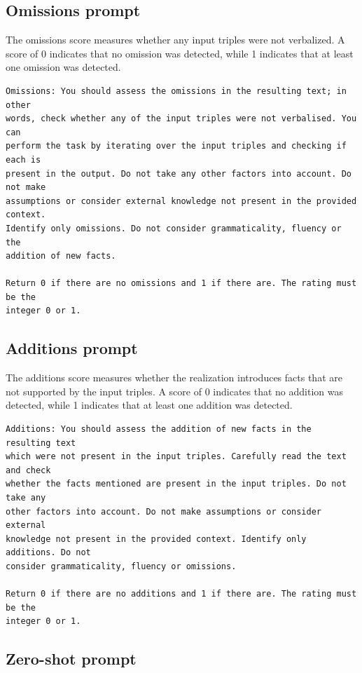 \subsection{Omissions prompt}

The omissions score measures whether any input triples were not verbalized. A
score of 0 indicates that no omission was detected, while 1 indicates that at
least one omission was detected.

\begin{lstlisting}
Omissions: You should assess the omissions in the resulting text; in other
words, check whether any of the input triples were not verbalised. You can
perform the task by iterating over the input triples and checking if each is
present in the output. Do not take any other factors into account. Do not make
assumptions or consider external knowledge not present in the provided context.
Identify only omissions. Do not consider grammaticality, fluency or the
addition of new facts.

Return 0 if there are no omissions and 1 if there are. The rating must be the
integer 0 or 1.
\end{lstlisting}

\subsection{Additions prompt}

The additions score measures whether the realization introduces facts that are
not supported by the input triples. A score of 0 indicates that no addition was
detected, while 1 indicates that at least one addition was detected.

\begin{lstlisting}
Additions: You should assess the addition of new facts in the resulting text
which were not present in the input triples. Carefully read the text and check
whether the facts mentioned are present in the input triples. Do not take any
other factors into account. Do not make assumptions or consider external
knowledge not present in the provided context. Identify only additions. Do not
consider grammaticality, fluency or omissions.

Return 0 if there are no additions and 1 if there are. The rating must be the
integer 0 or 1.
\end{lstlisting}

\subsection{Zero-shot prompt}

